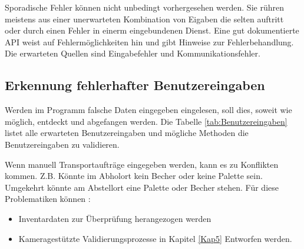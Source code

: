 Sporadische Fehler können nicht unbedingt vorhergesehen werden. 
Sie rühren meistens aus einer unerwarteten Kombination von Eigaben die selten auftritt oder durch einen Fehler in einerm eingebundenen Dienst. 
Eine gut dokumentierte API weist auf Fehlermöglichkeiten hin und gibt Hinweise zur Fehlerbehandlung.
Die erwarteten Quellen sind Eingabefehler und Kommunikationsfehler.

\subsection{Erkennung fehlerhafter Benutzereingaben}

Werden im Programm falsche Daten eingegeben eingelesen, soll dies, soweit wie möglich, entdeckt und abgefangen werden.
Die Tabelle \ref{tab:Benutzereingaben} listet alle erwarteten Benutzereingaben und mögliche Methoden die Benutzereingaben
zu validieren.



Wenn manuell Transportaufträge eingegeben werden, kann es zu Konflikten kommen.
Z.B. Könnte im Abholort kein Becher oder keine Palette sein.
Umgekehrt könnte am Abstellort eine Palette oder Becher stehen.
Für diese Problematiken können :
\begin{itemize}
    \item Inventardaten zur Überprüfung herangezogen werden
    \item Kameragestützte Validierungsprozesse in Kapitel \ref{Kap5} Entworfen werden.
\end{itemize}